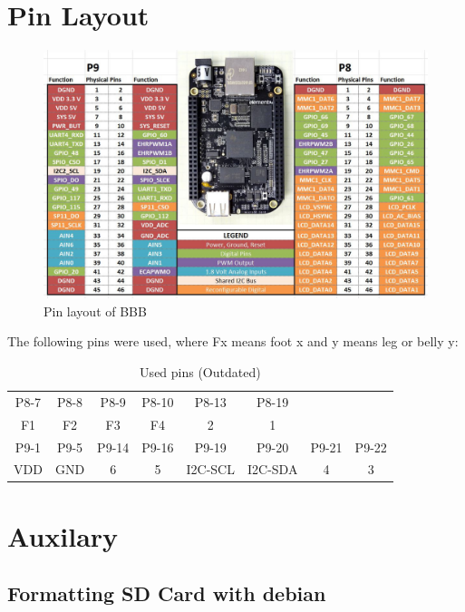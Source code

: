 \documentclass[
	fontsize=10pt
	paper=a4
]{scrartcl}
\begin{document}
\section{Pin Layout}

\begin{figure}[h!]
\begin{center}
\includegraphics[width=.95\textwidth]{Images/beaglebone-black-pinout.jpg}
\caption{Pin layout of BBB}
\end{center}
\end{figure}

The following pins were used, where Fx means foot x and y means leg or belly y:

\begin{table}[h!]
\begin{center}
\caption{Used pins (Outdated)}
\begin{tabular}{cccccccc}
\toprule
P8-7 	& P8-8 	& P8-9 		& P8-10 & P8-13 	& P8-19 	&		& 		\\
F1		& F2	& F3		& F4	& 2			& 1 		&		& 		\\
\midrule
P9-1 	& P9-5 	& P9-14 	& P9-16 & P9-19 	& P9-20		& P9-21	& P9-22 \\
VDD		& GND	& 6			& 5		& I2C-SCL	& I2C-SDA 	& 4		& 3 	\\
\bottomrule
\end{tabular}
\end{center}
\end{table}




\section{Auxilary}

\subsection{Formatting SD Card with debian}
\end{document}
